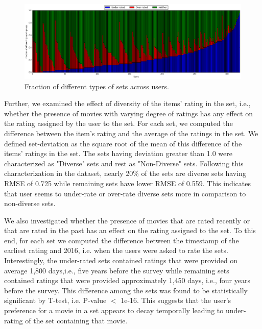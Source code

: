 \begin{figure}[ht]
  \includegraphics[scale=0.45]{figures/underrated.png}
  \caption{Fraction of different types of sets across users.}
  \label{fig:underrated}
\end{figure}


Further, we examined the effect of diversity of the items' rating in the set,
i.e., whether the presence of movies with varying degree of ratings has any
effect on the rating assigned by the user to the set. For each set, we
computed the difference between the item's rating and the average of the ratings
in the set. We defined set-deviation as the square root of the mean of this
difference of the items' ratings in the set. The sets having deviation
greater than 1.0 were characterized as "Diverse" sets and rest as
"Non-Diverse" sets. Following this characterization in the dataset, nearly 20\%
of the sets are diverse sets having RMSE of 0.725 while remaining sets
have lower RMSE of 0.559.  This indicates that user seems to under-rate or
over-rate diverse sets more in comparison to non-diverse sets.


We also investigated whether the presence of movies that are rated recently or
that are rated in the past has an effect on the rating assigned to the set.
To this end, for each set we computed the difference between the timestamp of
the earliest rating and 2016, i.e. when the users were asked to rate the sets.
Interestingly, the under-rated sets contained ratings that were provided on
average 1,800 days,i.e., five years before the survey while remaining sets
contained ratings that were provided approximately 1,450 days, i.e.,
four years before the survey. This difference among the sets was found to be
statistically significant by T-test, i.e. P-value $<$ 1e-16. This suggests that
the user's preference for a movie in a set appears to decay temporally leading
to under-rating of the set containing that movie.

